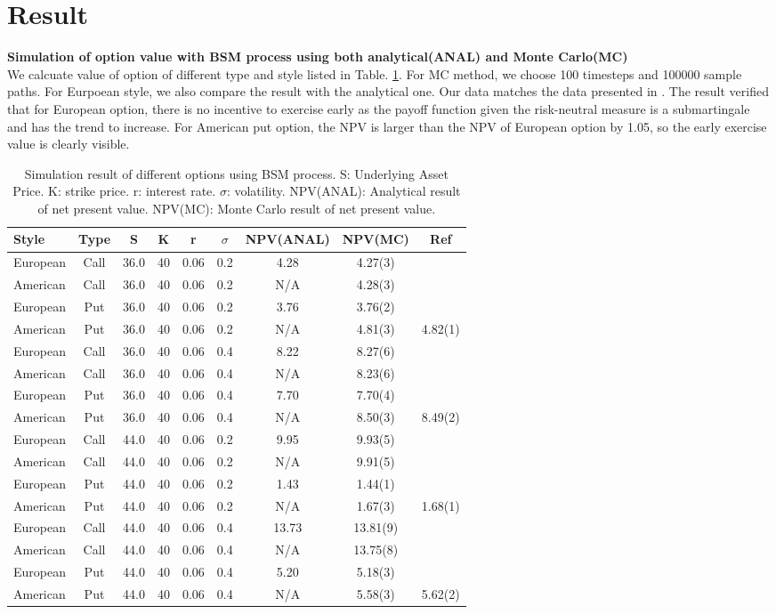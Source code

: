 \documentclass[a4paper]{article}
\begin{document}
\section{Result}
{\bf Simulation of option value with BSM process using both analytical(ANAL) and Monte Carlo(MC)}\\
We calcuate value of  option of different type and style listed in Table. \ref{option_bsm}. For MC method, we choose 100 timesteps and 100000 sample paths. For Eurpoean style, we also compare the result with the analytical one. Our data matches the data presented in \cite{americanoption}. The result verified that for European option, there is no incentive to exercise early as the payoff function given the risk-neutral measure is a submartingale and has the trend to increase. For American put option, the NPV is larger than the NPV of European option by 1.05, so the early exercise value is clearly visible.
\begin{table}
	\begin{tabular} { l  c  c   c  c  c       c       c        c  }
		Style 	 & Type & S  & K & r & $\sigma$ & NPV(ANAL) & NPV(MC) &Ref\cite{americanoption}\\
	\hline 
		European & Call & 36.0 & 40 & 0.06 & 0.2 & 4.28 & 4.27(3) & \\
		American & Call & 36.0 & 40 & 0.06 & 0.2 & N/A  & 4.28(3) &\\
		European & Put  & 36.0 & 40 & 0.06 & 0.2 & 3.76 & 3.76(2) &\\
		American & Put  & 36.0 & 40 & 0.06 & 0.2 & N/A  & 4.81(3) & 4.82(1)\\
		European & Call & 36.0 & 40 & 0.06 & 0.4 & 8.22 & 8.27(6) &\\
		American & Call & 36.0 & 40 & 0.06 & 0.4 & N/A  & 8.23(6) &\\
		European & Put  & 36.0 & 40 & 0.06 & 0.4 & 7.70 & 7.70(4) &\\
		American & Put  & 36.0 & 40 & 0.06 & 0.4 & N/A  & 8.50(3) & 8.49(2)\\
		European & Call & 44.0 & 40 & 0.06 & 0.2 & 9.95 & 9.93(5) &\\
		American & Call & 44.0 & 40 & 0.06 & 0.2 & N/A  & 9.91(5) &\\
		European & Put  & 44.0 & 40 & 0.06 & 0.2 & 1.43 & 1.44(1) &\\
		American & Put  & 44.0 & 40 & 0.06 & 0.2 & N/A  & 1.67(3) & 1.68(1)\\
		European & Call & 44.0 & 40 & 0.06 & 0.4 & 13.73 & 13.81(9) &\\
		American & Call & 44.0 & 40 & 0.06 & 0.4 & N/A  & 13.75(8) &\\
		European & Put  & 44.0 & 40 & 0.06 & 0.4 & 5.20 &  5.18(3)&\\
		American & Put  & 44.0 & 40 & 0.06 & 0.4 & N/A  &  5.58(3)& 5.62(2)\\
	\hline
	\end{tabular}\\
\caption{Simulation result of different options using BSM process.
	S: Underlying Asset Price. K: strike price. r: interest rate. 
	$\sigma$: volatility. NPV(ANAL): Analytical result of net present value.
	NPV(MC): Monte Carlo result of net present value.}\label{option_bsm}
\end{table}
\appendix
\end{document}
